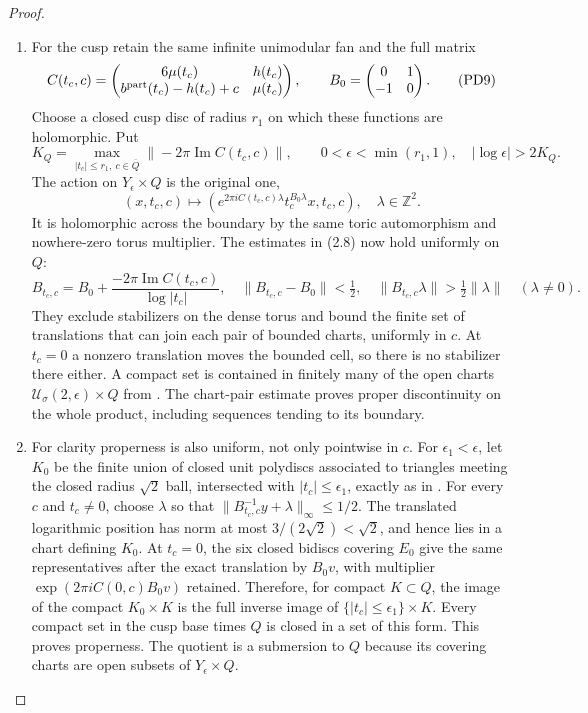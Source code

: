 \begin{proof}
\begin{enumerate}[label=\arabic*.,leftmargin=*]
\item For the cusp retain the same infinite unimodular fan and the full matrix
\[
 C(t_c,c)=
 \begin{pmatrix}6\mu(t_c)&h(t_c)\\
 b^{\rm part}(t_c)-h(t_c)+c&\mu(t_c)
 \end{pmatrix},\qquad
 B_0=\begin{pmatrix}0&1\\-1&0\end{pmatrix}.
 \tag{PD9}
\]
Choose a closed cusp disc of radius $r_1$ on which these functions are
holomorphic. Put
\[
 K_Q=\max_{|t_c|\le r_1,\ c\in\overline Q}
          \|-2\pi\operatorname{Im}C(t_c,c)\|,
 \qquad 0<\epsilon<\min(r_1,1),\quad
          |\log\epsilon|>2K_Q.
 \tag{PD10}
\]
The action on $Y_\epsilon\times Q$ is the original one,
\[
 (x,t_c,c)\longmapsto
 \left(e^{2\pi iC(t_c,c)\lambda}
                  t_c^{B_0\lambda}x,t_c,c\right),
 \quad\lambda\in\mathbb Z^2.
 \tag{PD11}
\]
It is holomorphic across the boundary by the same toric automorphism
and nowhere-zero torus multiplier. The estimates in (2.8) now hold
uniformly on $Q$:
\[
 B_{t_c,c}=B_0+
       \frac{-2\pi\operatorname{Im}C(t_c,c)}{\log|t_c|},\quad
 \|B_{t_c,c}-B_0\|<\tfrac12,\quad
 \|B_{t_c,c}\lambda\|>\tfrac12\|\lambda\|\quad(\lambda\ne0).
 \tag{PD12}
\]
They exclude stabilizers on the dense torus and bound the finite set
of translations that can join each pair of bounded charts, uniformly
in $c$. At $t_c=0$ a nonzero translation moves the bounded cell, so
there is no stabilizer there either. A compact set is contained in finitely
many of the open charts $\mathcal U_\sigma(2,\epsilon)\times Q$ from
.
The chart-pair estimate proves proper discontinuity on the whole
product, including sequences tending to its boundary.

\item For clarity properness is also uniform, not only pointwise in $c$.
For $\epsilon_1<\epsilon$, let $K_0$ be the finite union of closed
unit polydiscs associated to triangles meeting the closed radius
$\sqrt2$ ball, intersected with $|t_c|\le\epsilon_1$, exactly as in
. For every $c$ and $t_c\ne0$,
choose $\lambda$ so that
$\|B_{t_c,c}^{-1}y+\lambda\|_\infty\le1/2$.
The translated logarithmic position has norm at most
$3/(2\sqrt2)<\sqrt2$, and hence lies in a chart defining $K_0$.
At $t_c=0$, the six closed bidiscs covering $E_0$ give the same
representatives after the exact translation by $B_0v$, with multiplier
$\exp(2\pi iC(0,c)B_0v)$ retained. Therefore, for compact $K\subset Q$,
the image of the compact $K_0\times K$ is the full inverse image of
$\{|t_c|\le\epsilon_1\}\times K$. Every compact set in the cusp
base times $Q$ is closed in a set of this form. This proves properness.
The quotient is a submersion to $Q$ because its covering charts are
open subsets of $Y_\epsilon\times Q$.


\end{enumerate}
\end{proof}
